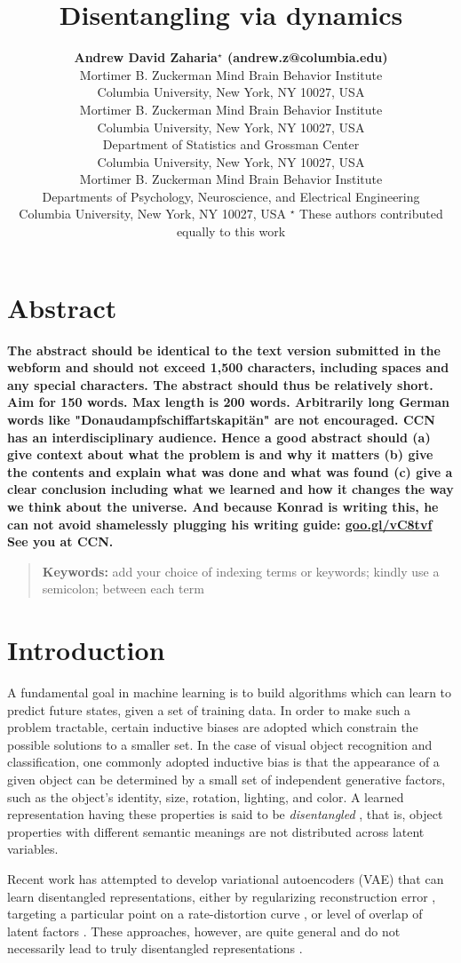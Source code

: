 \documentclass[10pt,letterpaper]{article}
\title{Disentangling via dynamics}
\author{{\large \bf Andrew David Zaharia$^\star$ (andrew.z@columbia.edu)} \\
  Mortimer B. Zuckerman Mind Brain Behavior Institute\\
  Columbia University, New York, NY 10027, USA
  \AND {\large \bf Benjamin Peters$^\star$ (bp2576@columbia.edu)} \\
  Mortimer B. Zuckerman Mind Brain Behavior Institute\\
  Columbia University, New York, NY 10027, USA
  \AND {\large \bf John Cunningham (jpc2181@columbia.edu)} \\
  Department of Statistics and Grossman Center\\
  Columbia University, New York, NY 10027, USA
  \AND {\large \bf Nikolaus Kriegeskorte (n.kriegeskorte@columbia.edu)} \\
  Mortimer B. Zuckerman Mind Brain Behavior Institute\\ Departments of Psychology, Neuroscience, and Electrical Engineering\\
  Columbia University, New York, NY 10027, USA
  \AND $^\star$ These authors contributed equally to this work}
\begin{document}
\maketitle

\section{Abstract}
{
\bf
The abstract should be identical to the text version submitted in the webform and should not exceed 1,500 characters, including spaces and any special characters. The abstract should thus be relatively short. Aim for 150 words.
Max length is 200 words. Arbitrarily long German words like "Donaudampfschiffartskapit\"an" are not encouraged.
CCN has an interdisciplinary audience. Hence a good abstract should
(a) give context about what the problem is and why it matters 
(b) give the contents and explain what was done and what was found
(c) give a clear conclusion including what we learned and how it changes 
the way we think about the universe.
And because Konrad is writing this, he can not avoid shamelessly plugging
his writing guide:
\url{goo.gl/vC8tvf} See you at CCN.
}
\begin{quote}
\small
\textbf{Keywords:} 
add your choice of indexing terms or keywords; kindly use a
semicolon; between each term
\end{quote}

\section{Introduction}

A fundamental goal in machine learning is to build algorithms which can learn to predict future states, given a set of training data. In order to make such a problem tractable, certain inductive biases are adopted which constrain the possible solutions to a smaller set. In the case of visual object recognition and classification, one commonly adopted inductive bias is that the appearance of a given object can be determined by a small set of independent generative factors, such as the object’s identity, size, rotation, lighting, and color. A learned representation having these properties is said to be \textit{disentangled} \cite{DiCarlo2007,Bengio2009}, that is, object properties with different semantic meanings are not distributed across latent variables.

Recent work has attempted to develop variational autoencoders (VAE) \cite{Kingma2014} that can learn disentangled representations, either by regularizing reconstruction error \cite{Higgins2017}, targeting a particular point on a rate-distortion curve \cite{Alemi2017}, or level of overlap of latent factors \cite{Mathieu2018}. These approaches, however, are quite general and do not necessarily lead to truly disentangled representations \cite{Alemi2017,Mathieu2018}.
\end{document}
